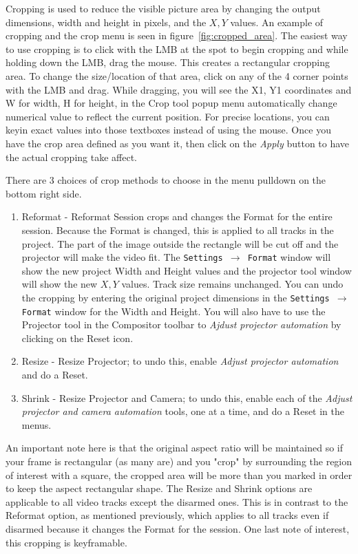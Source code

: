 Cropping is used to reduce the visible picture area by changing the output dimensions, width and
height in pixels, and the $X, Y$ values. An example of cropping and the crop menu is seen in
figure~\ref{fig:cropped_area}.
The easiest way to use cropping is to click with the LMB 
at the spot to begin cropping and while holding down the LMB, drag the mouse. This creates a rectangular
cropping area.  To change the size/location of that area, click on any of the 4 corner points
with the LMB and drag.  While dragging, you will see 
the X1, Y1 coordinates and W for width, H for height, in the Crop tool popup menu
automatically change numerical value to reflect the current position. For precise locations, you
can keyin exact values into those textboxes instead of using the mouse.
Once you have the crop area defined as you want it, then click on the \textit{Apply} button to have
the actual cropping take affect.

There are 3 choices of crop methods to choose in the menu pulldown on the bottom right side.
\begin{enumerate}
     \item Reformat - Reformat Session crops and changes the Format for the entire session. 
Because the Format is changed, this is applied to all tracks in the project.
The part of the image outside the rectangle will be cut off and the projector will make the video fit.
The  \texttt{Settings $\rightarrow$ Format} window will show the new project Width and Height values and
the projector tool window will show the new $X, Y$ values. Track size remains unchanged.
You can undo the cropping by entering the original project dimensions in the
\texttt{Settings $\rightarrow$ Format} window for the Width and Height.  You will also have to use the Projector
tool in the Compositor toolbar to \textit{Ajdust projector automation} by clicking on the Reset icon.
     \item Resize - Resize Projector; to undo this, enable \textit{Adjust projector automation} 
and do a Reset.
     \item Shrink - Resize Projector and Camera; to undo this, enable each of the \textit{Adjust
projector and camera automation} tools, one at a time, and do a Reset in the menus.
\end{enumerate}
An important note here is that the original aspect ratio will be maintained so if your frame is
rectangular (as many are) and you "crop" by surrounding the region of interest with a square,
the cropped area will be more than you marked in order to keep the aspect rectangular shape.
The Resize and Shrink options are applicable to all video tracks except the disarmed ones. 
This is in contrast to the Reformat option, as mentioned previously, which applies to all tracks even if disarmed because it changes the Format for the session.
One last note of interest, this cropping is keyframable.

